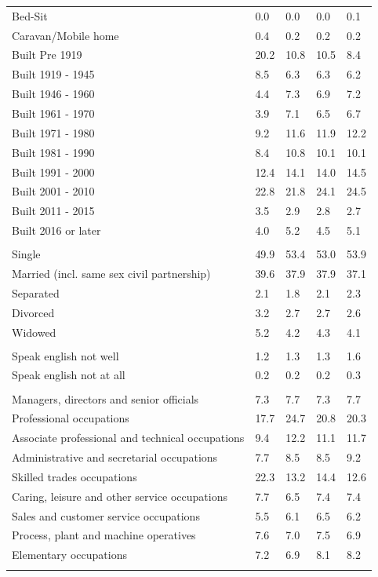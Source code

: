 \documentclass{article}
\begin{document}
\begin{table}[h]
\begin{tabular}{KTTTT}
Bed-Sit & 0.0& 0.0& 0.0& 0.1\\
Caravan/Mobile home & 0.4& 0.2& 0.2& 0.2\\
    \hline
Built Pre 1919 & 20.2& 10.8& 10.5&  8.4\\
Built 1919 - 1945 & 8.5& 6.3& 6.3& 6.2\\
Built  1946 - 1960 & 4.4& 7.3& 6.9& 7.2\\
Built  1961 - 1970 & 3.9& 7.1& 6.5& 6.7\\
Built  1971 - 1980 &  9.2& 11.6& 11.9& 12.2\\
Built  1981 - 1990 &  8.4& 10.8& 10.1& 10.1\\
Built  1991 - 2000 & 12.4& 14.1& 14.0& 14.5\\
Built  2001 - 2010 & 22.8& 21.8& 24.1& 24.5\\
Built  2011 - 2015 & 3.5& 2.9& 2.8& 2.7\\
Built  2016 or later & 4.0& 5.2& 4.5& 5.1\\
\hline
    \\
    \hline
Single & 49.9& 53.4& 53.0& 53.9\\
Married (incl. same sex civil partnership) & 39.6& 37.9& 37.9& 37.1\\
Separated  & 2.1& 1.8& 2.1& 2.3\\
Divorced  & 3.2& 2.7& 2.7& 2.6\\
Widowed & 5.2& 4.2& 4.3& 4.1\\
\hline
    \\ 
    \hline
Speak english not well & 1.2& 1.3& 1.3& 1.6\\
Speak english not at all & 0.2& 0.2& 0.2& 0.3\\
\hline
    \\
    \hline
Managers, directors and senior officials & 7.3& 7.7& 7.3& 7.7\\
Professional occupations & 17.7& 24.7& 20.8& 20.3\\
Associate professional and technical occupations &  9.4& 12.2& 11.1& 11.7\\
Administrative and secretarial occupations & 7.7& 8.5& 8.5& 9.2\\
Skilled trades occupations & 22.3& 13.2& 14.4& 12.6\\
Caring, leisure and other service occupations & 7.7& 6.5& 7.4& 7.4\\
Sales and customer service occupations & 5.5& 6.1& 6.5& 6.2\\
Process, plant and machine operatives & 7.6& 7.0& 7.5& 6.9\\
Elementary occupations & 7.2& 6.9& 8.1& 8.2\\
\hline
\end{tabular}
\end{table}
\end{document}
